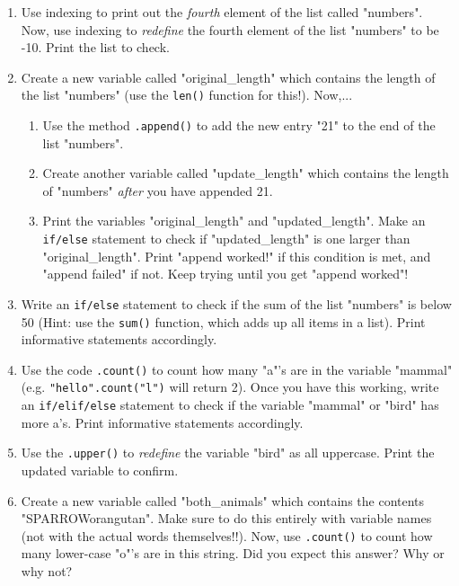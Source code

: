 \documentclass{article}[12pt]
\newcommand{\code}[1]{\texttt{#1}}  %
\begin{document}
    \begin{enumerate}
        \item Use indexing to print out the \emph{fourth} element of the list called "numbers". Now, use indexing to \emph{redefine} the fourth element of the list "numbers" to be -10. Print the list to check.
    
        \item Create a new variable called "original\_length" which contains the length of the list "numbers" (use the \code{len()} function for this!). Now,...
        \begin{enumerate}
            \item Use the method \code{.append()} to add the new entry "21" to the end of the list "numbers". 
            \item Create another variable called "update\_length" which contains the length of "numbers" \emph{after} you have appended 21. 
            \item Print the variables "original\_length" and "updated\_length". Make an \code{if/else} statement to check if "updated\_length" is one larger than "original\_length". Print "append worked!" if this condition is met, and "append failed" if not. Keep trying until you get "append worked"!
        \end{enumerate}    
        \item Write an \code{if/else} statement to check if the sum of the list "numbers" is below 50 (Hint: use the \code{sum()} function, which adds up all items in a list). Print informative statements accordingly. 
    
        \item Use the code \code{.count()} to count how many "a"'s are in the variable "mammal" (e.g. \code{"hello".count("l")} will return 2). Once you have this working, write an \code{if/elif/else} statement to check if the variable "mammal" or "bird" has more a's. Print informative statements accordingly.
    
        \item Use the \code{.upper()} to \emph{redefine} the variable "bird" as all uppercase. Print the updated variable to confirm.
    
        \item Create a new variable called "both\_animals" which contains the contents "SPARROWorangutan". Make sure to do this entirely with variable names (not with the actual words themselves!!). Now, use \code{.count()} to count how many lower-case "o"'s are in this string. Did you expect this answer? Why or why not?
    

\end{enumerate}
\end{document}

